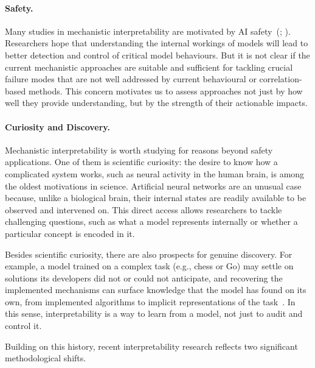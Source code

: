 \paragraph{Safety.}
Many studies in mechanistic interpretability are motivated by AI safety~(; ). %
Researchers hope that understanding the internal workings of models will lead to better detection and control of critical model behaviours. But it is not clear if the current mechanistic approaches are suitable and sufficient for tackling crucial failure modes that are not well addressed by current behavioural or correlation-based methods. This concern motivates us to assess approaches not just by how well they provide understanding, but by the strength of their actionable impacts.

\paragraph{Curiosity and Discovery.}
Mechanistic interpretability is worth studying for reasons beyond safety applications. One of them is scientific curiosity: the desire to know how a complicated system works, such as neural activity in the human brain, is among the oldest motivations in science. Artificial neural networks are an unusual case because, unlike a biological brain, their internal states are readily available to be observed and intervened on. This direct access allows researchers to tackle challenging questions, such as what a model represents internally or whether a particular concept is encoded in it. 

Besides scientific curiosity, there are also prospects for genuine discovery. For example, a model trained on a complex task (e.g., chess or Go) may settle on solutions its developers did not or could not anticipate, and recovering the implemented mechanisms can surface knowledge that the model has found on its own, from implemented algorithms to implicit representations of the task~. In this sense, interpretability is a way to learn from a model, not just to audit and control it.


Building on this history, recent interpretability research reflects two significant methodological shifts.


